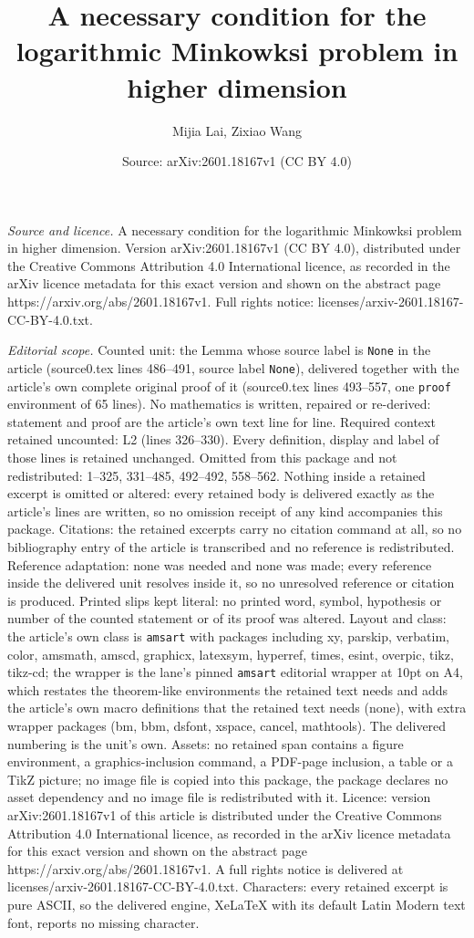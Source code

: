 \documentclass[10pt,a4paper]{amsart}
\title[A necessary condition for the logarithmic Minkowksi problem ]{A necessary condition for the logarithmic Minkowksi problem in higher dimension}
\author{Mijia Lai, Zixiao Wang}
\date{Source: arXiv:2601.18167v1 (CC BY 4.0)}
\begin{document}
\maketitle

\noindent\emph{Source and licence.} A necessary condition for the logarithmic Minkowksi problem in higher dimension. Version arXiv:2601.18167v1 (CC BY 4.0), distributed under the Creative Commons Attribution 4.0 International licence, as recorded in the arXiv licence metadata for this exact version and shown on the abstract page https://arxiv.org/abs/2601.18167v1. Full rights notice: licenses/arxiv-2601.18167-CC-BY-4.0.txt.\par\smallskip

\noindent\textit{Editorial scope.} Counted unit: the Lemma whose source label is \texttt{None} in the article (source0.tex lines 486--491, source label \texttt{None}), delivered together with the article's own complete original proof of it (source0.tex lines 493--557, one \texttt{proof} environment of 65 lines). No mathematics is written, repaired or re-derived: statement and proof are the article's own text line for line. Required context retained uncounted: L2 (lines 326--330). Every definition, display and label of those lines is retained unchanged. Omitted from this package and not redistributed: 1--325, 331--485, 492--492, 558--562. Nothing inside a retained excerpt is omitted or altered: every retained body is delivered exactly as the article's lines are written, so no omission receipt of any kind accompanies this package. Citations: the retained excerpts carry no citation command at all, so no bibliography entry of the article is transcribed and no reference is redistributed. Reference adaptation: none was needed and none was made; every reference inside the delivered unit resolves inside it, so no unresolved reference or citation is produced. Printed slips kept literal: no printed word, symbol, hypothesis or number of the counted statement or of its proof was altered. Layout and class: the article's own class is \texttt{amsart} with packages including xy, parskip, verbatim, color, amsmath, amscd, graphicx, latexsym, hyperref, times, esint, overpic, tikz, tikz-cd; the wrapper is the lane's pinned \texttt{amsart} editorial wrapper at 10pt on A4, which restates the theorem-like environments the retained text needs and adds the article's own macro definitions that the retained text needs (none), with extra wrapper packages (bm, bbm, dsfont, xspace, cancel, mathtools). The delivered numbering is the unit's own. Assets: no retained span contains a figure environment, a graphics-inclusion command, a PDF-page inclusion, a table or a TikZ picture; no image file is copied into this package, the package declares no asset dependency and no image file is redistributed with it. Licence: version arXiv:2601.18167v1 of this article is distributed under the Creative Commons Attribution 4.0 International licence, as recorded in the arXiv licence metadata for this exact version and shown on the abstract page https://arxiv.org/abs/2601.18167v1. A full rights notice is delivered at licenses/arxiv-2601.18167-CC-BY-4.0.txt. Characters: every retained excerpt is pure ASCII, so the delivered engine, XeLaTeX with its default Latin Modern text font, reports no missing character.
\end{document}
